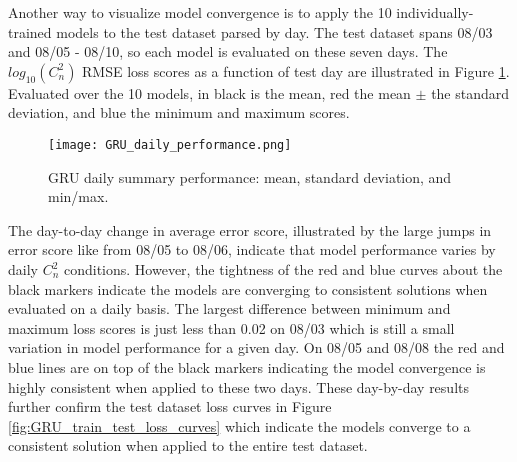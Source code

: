 Another way to visualize model convergence is to apply the 10 individually-trained models to the test dataset parsed by day. The test dataset spans 08/03 and 08/05 - 08/10, so each model is evaluated on these seven days. The $log_{10}(C_{n}^{2})$ RMSE loss scores as a function of test day are illustrated in Figure \ref{fig:GRU_daily_performance}. Evaluated over the 10 models, in black is the mean, red the mean $\pm$ the standard deviation, and blue the minimum and maximum scores.
\begin{figure}[h!]
	\centering
	\texttt{[image: GRU\_daily\_performance.png]}
	\caption{GRU daily summary performance: mean, standard deviation, and min/max.}
	\label{fig:GRU_daily_performance}
\end{figure}
The day-to-day change in average error score, illustrated by the large jumps in error score like from 08/05 to 08/06, indicate that model performance varies by daily $C_{n}^{2}$ conditions. However, the tightness of the red and blue curves about the black markers indicate the models are converging to consistent solutions when evaluated on a daily basis. The largest difference between minimum and maximum loss scores is just less than 0.02 on 08/03 which is still a small variation in model performance for a given day. On 08/05 and 08/08 the red and blue lines are on top of the black markers indicating the model convergence is highly consistent when applied to these two days. These day-by-day results further confirm the test dataset loss curves in Figure \ref{fig:GRU_train_test_loss_curves} which indicate the models converge to a consistent solution when applied to the entire test dataset.

